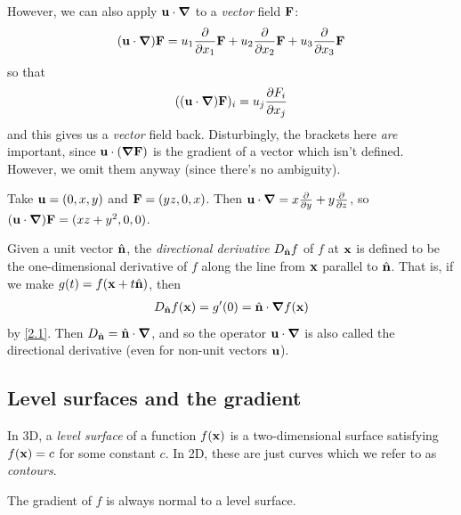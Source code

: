 \documentclass{../template/note}
\begin{document}
    However, we can also apply \(\V u \cdot \grad\) to a \emph{vector} field \(\V F\):
    \begin{align*}
        (\V u \cdot \grad) \V F = u_1 \pd{}{x_1} \V F + u_2 \pd{}{x_2} \V F + u_3 \pd{}{x_3} \V F
    \end{align*}
    so that
    \begin{align*}
        ((\V u \cdot \grad) \V F)_i = u_j \pd{F_i}{x_j}
    \end{align*}
    and this gives us a \emph{vector} field back. Disturbingly, the brackets here \emph{are} important, since \(\V u \cdot (\grad \V F)\) is the gradient of a vector which isn't defined. However, we omit them anyway (since there's no ambiguity).
    
    \begin{example*}
        Take \(\V u = (0, x, y)\) and \(\V F = (yz, 0, x)\). Then \(\V u \cdot \grad = x \pd{}{y} + y \pd{}{z}\), so \((\V u \cdot \grad) \V F = (xz + y^2, 0, 0)\).
    \end{example*}
    
    \begin{definition*}
        Given a unit vector \(\hvec n\), the \emph{directional derivative} \(D_{\hvec n}f\) of \(f\) at \(\V x\) is defined to be the one-dimensional derivative of \(f\) along the line from \(\V x\) parallel to \(\hvec n\). That is, if we make \(g(t) = f(\V x + t \hvec n)\), then
        \begin{align*}
            D_{\hvec n}f(\V x) = g'(0) = \hvec n \cdot \grad f(\V x)
        \end{align*}
        by \cref{2.1}. Then \(D_{\hvec n} = \hvec n \cdot \grad\), and so the operator \(\V u \cdot \grad\) is also called the directional derivative (even for non-unit vectors \(\V u\)).    
    \end{definition*}
    
    \subsection{Level surfaces and the gradient}

    \begin{definition*}
        In 3D, a \emph{level surface} of a function \(f(\V x)\) is a two-dimensional surface satisfying \(f(\V x) = c\) for some constant \(c\). In 2D, these are just curves which we refer to as \emph{contours}.
    \end{definition*}
    
    \begin{proposition*}
        The gradient of \(f\) is always normal to a level surface.
    \end{proposition*}
    
\end{document}
